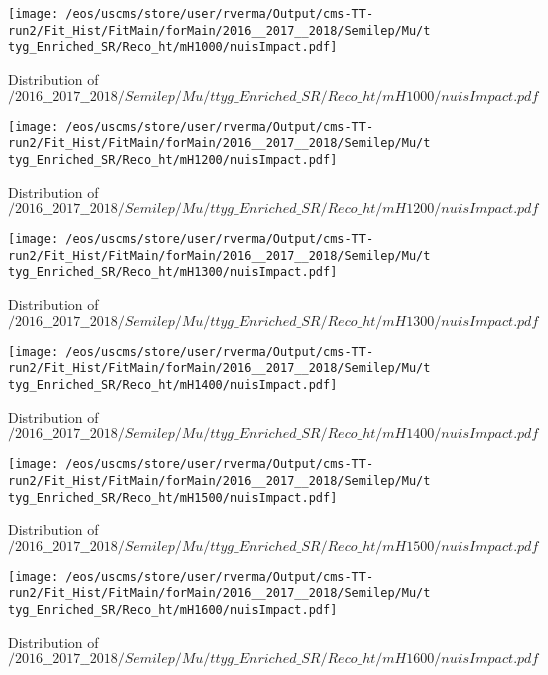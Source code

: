 \begin{figure}
\centering
\texttt{[image: /eos/uscms/store/user/rverma/Output/cms-TT-run2/Fit\_Hist/FitMain/forMain/2016\_\_2017\_\_2018/Semilep/Mu/ttyg\_Enriched\_SR/Reco\_ht/mH1000/nuisImpact.pdf]}
\caption{Distribution of $/2016\_\_2017\_\_2018/Semilep/Mu/ttyg\_Enriched\_SR/Reco\_ht/mH1000/nuisImpact.pdf$}
\end{figure}

\begin{figure}
\centering
\texttt{[image: /eos/uscms/store/user/rverma/Output/cms-TT-run2/Fit\_Hist/FitMain/forMain/2016\_\_2017\_\_2018/Semilep/Mu/ttyg\_Enriched\_SR/Reco\_ht/mH1200/nuisImpact.pdf]}
\caption{Distribution of $/2016\_\_2017\_\_2018/Semilep/Mu/ttyg\_Enriched\_SR/Reco\_ht/mH1200/nuisImpact.pdf$}
\end{figure}

\begin{figure}
\centering
\texttt{[image: /eos/uscms/store/user/rverma/Output/cms-TT-run2/Fit\_Hist/FitMain/forMain/2016\_\_2017\_\_2018/Semilep/Mu/ttyg\_Enriched\_SR/Reco\_ht/mH1300/nuisImpact.pdf]}
\caption{Distribution of $/2016\_\_2017\_\_2018/Semilep/Mu/ttyg\_Enriched\_SR/Reco\_ht/mH1300/nuisImpact.pdf$}
\end{figure}

\begin{figure}
\centering
\texttt{[image: /eos/uscms/store/user/rverma/Output/cms-TT-run2/Fit\_Hist/FitMain/forMain/2016\_\_2017\_\_2018/Semilep/Mu/ttyg\_Enriched\_SR/Reco\_ht/mH1400/nuisImpact.pdf]}
\caption{Distribution of $/2016\_\_2017\_\_2018/Semilep/Mu/ttyg\_Enriched\_SR/Reco\_ht/mH1400/nuisImpact.pdf$}
\end{figure}

\begin{figure}
\centering
\texttt{[image: /eos/uscms/store/user/rverma/Output/cms-TT-run2/Fit\_Hist/FitMain/forMain/2016\_\_2017\_\_2018/Semilep/Mu/ttyg\_Enriched\_SR/Reco\_ht/mH1500/nuisImpact.pdf]}
\caption{Distribution of $/2016\_\_2017\_\_2018/Semilep/Mu/ttyg\_Enriched\_SR/Reco\_ht/mH1500/nuisImpact.pdf$}
\end{figure}

\begin{figure}
\centering
\texttt{[image: /eos/uscms/store/user/rverma/Output/cms-TT-run2/Fit\_Hist/FitMain/forMain/2016\_\_2017\_\_2018/Semilep/Mu/ttyg\_Enriched\_SR/Reco\_ht/mH1600/nuisImpact.pdf]}
\caption{Distribution of $/2016\_\_2017\_\_2018/Semilep/Mu/ttyg\_Enriched\_SR/Reco\_ht/mH1600/nuisImpact.pdf$}
\end{figure}

